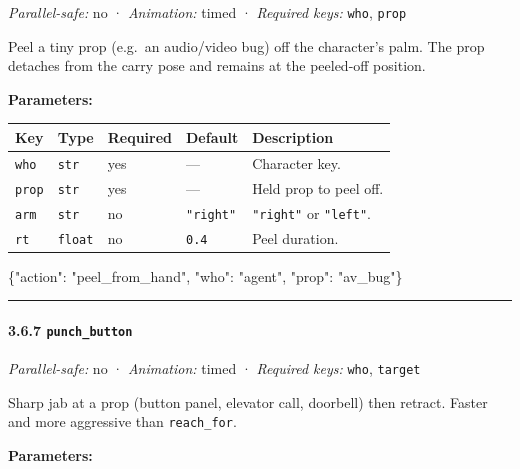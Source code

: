 \documentclass[
  12pt,
  letterpaper,
]{book}
\newenvironment{Shaded}{}{}
\newcommand{\DataTypeTok}[1]{\textcolor[rgb]{0.56,0.13,0.00}{#1}}
\newcommand{\FunctionTok}[1]{\textcolor[rgb]{0.02,0.16,0.49}{#1}}
\newcommand{\StringTok}[1]{\textcolor[rgb]{0.25,0.44,0.63}{#1}}
\begin{document}
\emph{Parallel-safe:} no · \emph{Animation:} timed · \emph{Required
keys:} \texttt{who}, \texttt{prop}

Peel a tiny prop (e.g.~an audio/video bug) off the character's palm. The
prop detaches from the carry pose and remains at the peeled-off
position.

\textbf{Parameters:}

\begin{longtable}[]{@{}lllll@{}}
\toprule\noalign{}
Key & Type & Required & Default & Description \\
\midrule\noalign{}
\endhead
\bottomrule\noalign{}
\endlastfoot
\texttt{who} & \texttt{str} & yes & --- & Character key. \\
\texttt{prop} & \texttt{str} & yes & --- & Held prop to peel off. \\
\texttt{arm} & \texttt{str} & no & \texttt{"right"} & \texttt{"right"}
or \texttt{"left"}. \\
\texttt{rt} & \texttt{float} & no & \texttt{0.4} & Peel duration. \\
\end{longtable}

\begin{Shaded}
\begin{Highlighting}[]
\FunctionTok{\{}\DataTypeTok{"action"}\FunctionTok{:} \StringTok{"peel\_from\_hand"}\FunctionTok{,} \DataTypeTok{"who"}\FunctionTok{:} \StringTok{"agent"}\FunctionTok{,} \DataTypeTok{"prop"}\FunctionTok{:} \StringTok{"av\_bug"}\FunctionTok{\}}
\end{Highlighting}
\end{Shaded}

\begin{center}\rule{0.5\linewidth}{0.5pt}\end{center}

\paragraph{\texorpdfstring{3.6.7
\texttt{punch\_button}}{3.6.7 punch\_button}}\label{punch_button}

\emph{Parallel-safe:} no · \emph{Animation:} timed · \emph{Required
keys:} \texttt{who}, \texttt{target}

Sharp jab at a prop (button panel, elevator call, doorbell) then
retract. Faster and more aggressive than \texttt{reach\_for}.

\textbf{Parameters:}
\end{document}
